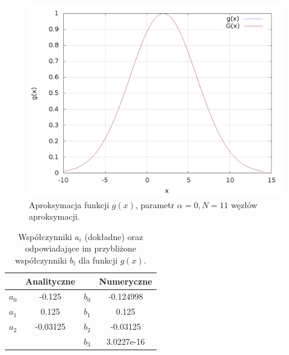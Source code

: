 \begin{figure}[h!]
	\begin{center}
		\includegraphics[height=0.43\linewidth]{n11.PNG}
	\caption{Aproksymacja funkcji $ g(x) $, parametr $ \alpha = 0, N = 11 $ węzłów aproksymacji.}
	\label{pierwsza} 
	\end{center}
\end{figure}

\begin{table}[h!]
	\centering
	\begin{tabular}{|c|c|c|c|}
		\hline
		& Analityczne & & Numeryczne \\
		\hline
		$ a_0 $ & -0.125 & $ b_0 $& -0.124998 \\
		$ a_1 $ & 0.125 & $ b_1 $&0.125 \\
		$ a_2 $ & -0.03125 & $ b_2 $&-0.03125 \\
		&  & $ b_3 $ & 3.0227e-16 \\
		\hline
	\end{tabular}
\caption{Współczynniki $ a_i $ (dokładne) oraz odpowiadające im przybliżone współczynniki $ b_i $ dla funkcji $ g(x) $.}
\end{table}

